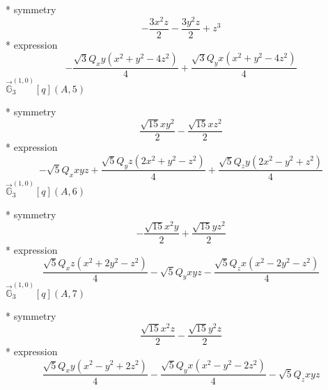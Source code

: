 \documentclass[fleqn,8pt]{jsarticle}
\begin{document}
\noindent\quad ** symmetry
\begin{dmath*}
- \frac{3 x^{2} z}{2} - \frac{3 y^{2} z}{2} + z^{3}
\end{dmath*}
\noindent\quad ** expression
\begin{dmath*}
- \frac{\sqrt{3} Q_{x} y \left(x^{2} + y^{2} - 4 z^{2}\right)}{4} + \frac{\sqrt{3} Q_{y} x \left(x^{2} + y^{2} - 4 z^{2}\right)}{4}
\end{dmath*}
\noindent\quad $\vec{\mathbb{G}}_{3}^{(1,0)}[q](A,5)$

\noindent\quad ** symmetry
\begin{dmath*}
\frac{\sqrt{15} x y^{2}}{2} - \frac{\sqrt{15} x z^{2}}{2}
\end{dmath*}
\noindent\quad ** expression
\begin{dmath*}
- \sqrt{5} Q_{x} x y z + \frac{\sqrt{5} Q_{y} z \left(2 x^{2} + y^{2} - z^{2}\right)}{4} + \frac{\sqrt{5} Q_{z} y \left(2 x^{2} - y^{2} + z^{2}\right)}{4}
\end{dmath*}
\noindent\quad $\vec{\mathbb{G}}_{3}^{(1,0)}[q](A,6)$

\noindent\quad ** symmetry
\begin{dmath*}
- \frac{\sqrt{15} x^{2} y}{2} + \frac{\sqrt{15} y z^{2}}{2}
\end{dmath*}
\noindent\quad ** expression
\begin{dmath*}
\frac{\sqrt{5} Q_{x} z \left(x^{2} + 2 y^{2} - z^{2}\right)}{4} - \sqrt{5} Q_{y} x y z - \frac{\sqrt{5} Q_{z} x \left(x^{2} - 2 y^{2} - z^{2}\right)}{4}
\end{dmath*}
\noindent\quad $\vec{\mathbb{G}}_{3}^{(1,0)}[q](A,7)$

\noindent\quad ** symmetry
\begin{dmath*}
\frac{\sqrt{15} x^{2} z}{2} - \frac{\sqrt{15} y^{2} z}{2}
\end{dmath*}
\noindent\quad ** expression
\begin{dmath*}
\frac{\sqrt{5} Q_{x} y \left(x^{2} - y^{2} + 2 z^{2}\right)}{4} - \frac{\sqrt{5} Q_{y} x \left(x^{2} - y^{2} - 2 z^{2}\right)}{4} - \sqrt{5} Q_{z} x y z
\end{dmath*}
\end{document}
